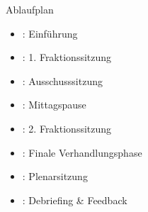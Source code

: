 \documentclass{beamer}
\begin{document}
\begin{frame}{Ablaufplan}
    \vspace{-1.5cm}
    \begin{itemize}
        \item \timeEinf: Einführung
        \item \timeFrakOne: 1. Fraktionssitzung
        \item \timeAuss: Ausschusssitzung
        \item \timeMittag: Mittagspause
        \item \timeFrakTwo: 2. Fraktionssitzung
        \item \timeFinVerh: Finale Verhandlungsphase
        \item \timePlenar: Plenarsitzung
	   	\item \timeDebr: Debriefing \& Feedback
    \end{itemize}
\end{frame}
\end{document}
